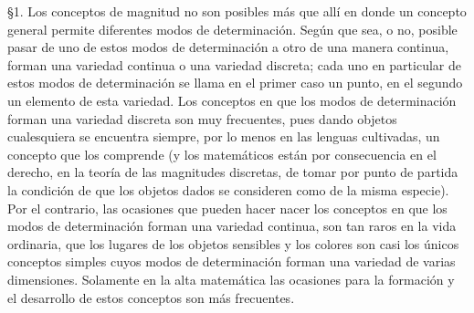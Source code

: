 \documentclass[a4paper, 12pt]{article}
\begin{document}
\bigskip

\S 1. \hspace{3 mm}Los conceptos de magnitud no son posibles más que allí  en donde un concepto general permite diferentes modos de determinación. Según que sea, o no, posible pasar de uno de estos modos de determinación a otro de una manera continua, forman una variedad continua o una variedad discreta; cada uno en particular de estos modos de determinación se llama en el primer caso un punto, en el segundo un elemento de esta variedad. Los conceptos en que los modos de determinación forman
una variedad discreta son muy frecuentes, pues dando objetos cualesquiera se encuentra siempre, por lo menos en las lenguas cultivadas, un concepto que los comprende (y los matemáticos están por consecuencia en el derecho, en la teoría de las magnitudes discretas, de tomar por punto de partida la condición de que los objetos dados se consideren como de la misma especie). Por el contrario, las ocasiones que pueden hacer nacer los conceptos en que los modos de determinación forman una variedad continua, son tan raros en la vida ordinaria, que los lugares de los objetos sensibles y los colores son casi los únicos conceptos simples cuyos modos de determinación forman una variedad de varias dimensiones. Solamente en la alta matemática las ocasiones para la formación y el desarrollo de estos conceptos son más frecuentes.
\end{document}

